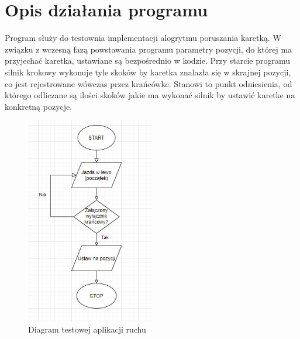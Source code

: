 \documentclass[10pt, a4paper]{article}
\begin{document}
\section{Opis działania programu}

Program służy do testownia implementacji alogrytmu poruszania karetką. W związku z wczesną fazą powstawania programu parametry pozycji, do której ma przyjechać karetka, ustawiane są bezpośrednio w kodzie. Przy starcie programu silnik krokowy wykonuje tyle skoków by karetka znalazła się w skrajnej pozycji, co jest rejestrowane wówczas przez krańcówke. Stanowi to punkt odniesienia, od którego odliczane są ilości skoków jakie ma wykonać silnik by ustawić karetke na konkretną pozycje. 

\begin{figure}[H]
	\centering
	\includegraphics[width=0.5\textwidth]{figures/diagram.png}
	\caption{Diagram testowej aplikacji ruchu}
	\label{fig:Diagram}
\end{figure}

%
%
%
%
\end{document}
